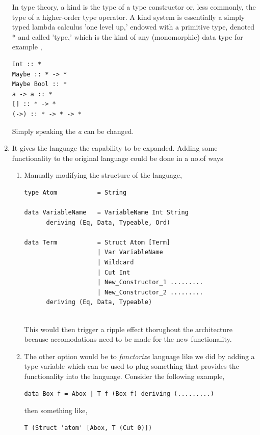 \documentclass[thesis-solanki.tex]{subfiles}
\begin{document}
\begin{enumerate}
In type theory, a kind is the type of a type constructor or, less commonly, the type of a higher-order type operator. A kind system is 
essentially a simply typed lambda calculus 'one level up,' endowed with a primitive type, denoted * and called 'type,' which is the kind of 
any (monomorphic) data type for example \cite{website:kindhaskellwiki},

\begin{verbatim}
Int :: *
Maybe :: * -> *
Maybe Bool :: *
a -> a :: *
[] :: * -> *
(->) :: * -> * -> *
\end{verbatim}  

Simply speaking the \textit{a} can be changed.  

\item It gives the language the capability to be expanded. Adding some functionality to the original language could be done in a no.of
ways 
\begin{enumerate}
\item Manually modifying the structure of the language,
\begin{verbatim}
type Atom         	= String

data VariableName 	= VariableName Int String
      deriving (Eq, Data, Typeable, Ord)

data Term 			= Struct Atom [Term]
          			| Var VariableName
          			| Wildcard  
          			| Cut Int
          			| New_Constructor_1 .........
          			| New_Constructor_2 .........
      deriving (Eq, Data, Typeable)
      
\end{verbatim}

This would then trigger a ripple effect thorughout the architecture because accomodations need to be made for the new functionality.

\item The other option would be to \textit{functorize} language like we did by adding a type variable which can be used to plug something that provides the functionality into the language.
Consider the following example,

\begin{verbatim}
data Box f = Abox | T f (Box f) deriving (.........)
\end{verbatim}

then something like,
\begin{verbatim}
T (Struct 'atom' [Abox, T (Cut 0)])
\end{verbatim}
   

\end{enumerate}
\end{enumerate}
\end{document}
